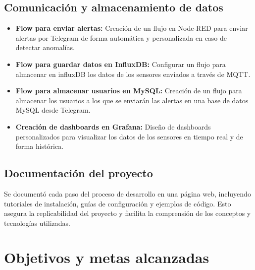 \subsection*{Comunicación y almacenamiento de datos}

\begin{itemize}
    \item \textbf{Flow para enviar alertas:} Creación de un flujo en Node-RED para enviar alertas por Telegram de forma automática y personalizada en caso de detectar anomalías.
    \item \textbf{Flow para guardar datos en InfluxDB:} Configurar un flujo para almacenar en influxDB los datos de los sensores enviados a través de MQTT.
    \item \textbf{Flow para almacenar usuarios en MySQL:} Creación de un flujo para almacenar los usuarios a los que se enviarán las alertas en una base de datos MySQL desde Telegram.
    \item \textbf{Creación de dashboards en Grafana:} Diseño de dashboards personalizados para visualizar los datos de los sensores en tiempo real y de forma histórica.
\end{itemize}

\subsection*{Documentación del proyecto}

Se documentó cada paso del proceso de desarrollo en una página web, incluyendo tutoriales de instalación, guías de configuración y ejemplos de código. Esto asegura la replicabilidad del proyecto y facilita la comprensión de los conceptos y tecnologías utilizadas.

\section{Objetivos y metas alcanzadas}

